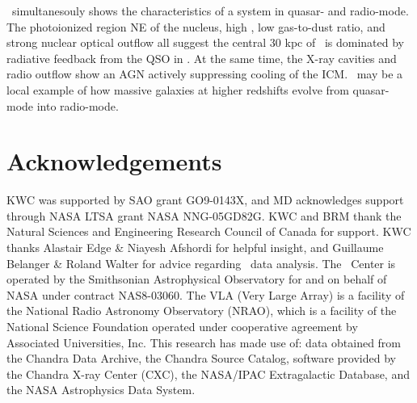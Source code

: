 \documentclass[useAMS,usenatbib]{mn2e}
\begin{document}
\irs\ simultanesouly shows the characteristics of a system in quasar-
and radio-mode. The photoionized region NE of the nucleus, high \leff,
low gas-to-dust ratio, and strong nuclear optical outflow all suggest
the central 30 kpc of \rxj\ is dominated by radiative feedback from
the QSO in \irs. At the same time, the X-ray cavities and radio
outflow show an AGN actively suppressing cooling of the ICM. \irs\ may
be a local example of how massive galaxies at higher redshifts evolve
from quasar-mode into radio-mode. 

\section*{Acknowledgements}

KWC was supported by SAO grant GO9-0143X, and MD acknowledges support
through NASA LTSA grant NASA NNG-05GD82G. KWC and BRM thank the
Natural Sciences and Engineering Research Council of Canada for
support. KWC thanks Alastair Edge \& Niayesh Afshordi for helpful
insight, and Guillaume Belanger \& Roland Walter for advice regarding
\integral\ data analysis. The \cxo\ Center is operated by the
Smithsonian Astrophysical Observatory for and on behalf of NASA under
contract NAS8-03060. The VLA (Very Large Array) is a facility of the
National Radio Astronomy Observatory (NRAO), which is a facility of
the National Science Foundation operated under cooperative agreement
by Associated Universities, Inc. This research has made use of: data
obtained from the Chandra Data Archive, the Chandra Source Catalog,
software provided by the Chandra X-ray Center (CXC), the NASA/IPAC
Extragalactic Database, and the NASA Astrophysics Data System.






\clearpage
\onecolumn







\label{lastpage}
\end{document}
